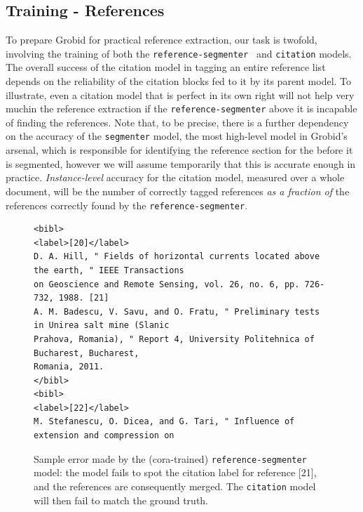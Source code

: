 \documentclass[11pt, oneside]{scrartcl}   	%
\begin{document}
\subsection{Training - References}

To prepare Grobid for practical reference extraction, our task is twofold, involving the training of both the \texttt{reference-segmenter } and \texttt{citation} models. The overall success of the citation model in tagging an entire reference list depends on the reliability of the citation blocks fed to it by its parent model. To illustrate, even a citation model that is perfect in its own right will not help very muchin the reference extraction if the \texttt{reference-segmenter} above it is incapable of finding the references. Note that, to be precise, there is a further dependency on the accuracy of the \texttt{segmenter} model, the most high-level model in Grobid's arsenal, which is responsible for identifying the reference section for the before it is segmented, however we will assume temporarily that this is accurate enough in practice. \emph{Instance-level} accuracy for the citation model, measured over a whole document, will be the number of correctly tagged references \emph{as a fraction of} the references correctly found by the \texttt{reference-segmenter}.

\begin{figure}
\begin{verbatim}
<bibl>
<label>[20]</label>
D. A. Hill, " Fields of horizontal currents located above the earth, " IEEE Transactions
on Geoscience and Remote Sensing, vol. 26, no. 6, pp. 726-732, 1988. [21] 
A. M. Badescu, V. Savu, and O. Fratu, " Preliminary tests in Unirea salt mine (Slanic
Prahova, Romania), " Report 4, University Politehnica of Bucharest, Bucharest,
Romania, 2011.
</bibl>
<bibl>
<label>[22]</label>
M. Stefanescu, O. Dicea, and G. Tari, " Influence of extension and compression on
\end{verbatim}
\caption{Sample error made by the (cora-trained) \texttt{reference-segmenter} model: the model fails to spot the citation label for reference [21], and the references are consequently merged. The \texttt{citation} model will then fail to match the ground truth.}
\label{fig:segerror}
\end{figure}
\end{document}
